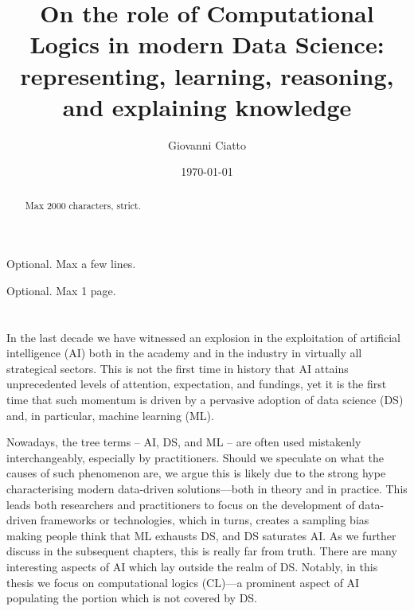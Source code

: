 \documentclass[12pt,a4paper,openright,twoside]{book}
\title{On the role of Computational Logics in modern Data Science: representing, learning, reasoning, and explaining knowledge}
\author{Giovanni Ciatto}
\date{\today}
\begin{document}
	
\frontmatter



\begin{abstract}	
Max 2000 characters, strict.
\end{abstract}

\begin{dedication} %
Optional. Max a few lines.
\end{dedication}

\begin{acknowledgements} %
Optional. Max 1 page.
\end{acknowledgements}

\tableofcontents   
\listoffigures     %
\lstlistoflistings %

\mainmatter

\chapter{\introductionname}
\label{chap:introduction}

In the last decade we have witnessed an explosion in the exploitation of artificial intelligence (AI) both in the academy and in the industry in virtually all strategical sectors.
%
This is not the first time in history that AI attains unprecedented levels of attention, expectation, and fundings, yet it is the first time that such momentum is driven by a pervasive adoption of data science (DS) and, in particular, machine learning (ML).

Nowadays, the tree terms -- AI, DS, and ML -- are often used mistakenly interchangeably, especially by practitioners.
%
Should we speculate on what the causes of such phenomenon are, we argue this is likely due to the strong hype characterising modern data-driven solutions---both in theory and in practice.
%
This leads both researchers and practitioners to focus on the development of data-driven frameworks or technologies, which in turns, creates a sampling bias making people think that ML exhausts DS, and DS saturates AI.
%
As we further discuss in the subsequent chapters, this is really far from truth.
%
There are many interesting aspects of AI which lay outside the realm of DS.
%
Notably, in this thesis we focus on computational logics (CL)---a prominent aspect of AI populating the portion which is not covered by DS.
\end{document}
